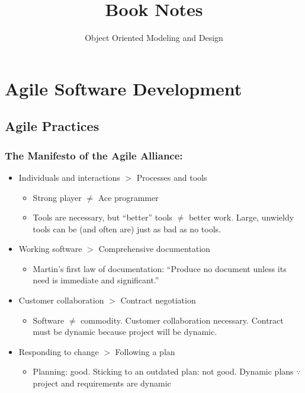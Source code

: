 \documentclass[11pt]{amsart}
\title{Book Notes}
\author{Object Oriented Modeling and Design}
\begin{document}
\maketitle
\lstset{language=Java}


\section{Agile Software Development}

\subsection{Agile Practices}

\subsubsection{The Manifesto of the Agile Alliance:}
\begin{itemize}
\item Individuals and interactions $>$ Processes and tools
	\begin{itemize}
	\item Strong player $\neq$ Ace programmer
	\item Tools are necessary, but ``better'' tools $\neq$ better work. Large, unwieldy tools can be (and often are) just as bad as no tools. 
	\end{itemize}
\item Working software $>$ Comprehensive documentation
	\begin{itemize}
	\item Martin's first law of documentation: ``Produce no document unless its need is immediate and significant.''
	\end{itemize}
\item Customer collaboration $>$ Contract negotiation
	\begin{itemize}
	\item Software $\neq$ commodity. Customer collaboration necessary. Contract must be dynamic because project will be dynamic.
	\end{itemize}
\item Responding to change $>$ Following a plan
	\begin{itemize}
	\item Planning: good. Sticking to an outdated plan: not good. Dynamic plans $\because$ project and requirements are dynamic
	\end{itemize}
\end{itemize}
\end{document}
